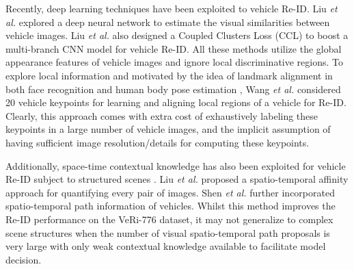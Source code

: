 \documentclass[10pt,twocolumn,letterpaper]{article}
\def\etal{\emph{et al.\hspace{0.3em}}}
\begin{document}
Recently, deep learning techniques have been exploited to vehicle Re-ID.  Liu
\etal \cite{liu2016veri} explored a deep neural network to estimate the
visual similarities between vehicle images.
%
Liu \etal \cite{liu2016vehicleid} also designed a Coupled Clusters Loss (CCL)
to boost a multi-branch CNN model for vehicle Re-ID.
%
All these methods utilize the global appearance features of vehicle images and
ignore local discriminative regions.
%
To explore local information and motivated by the idea of landmark alignment
\cite{zhang2014facial} in both face recognition \cite{taigman2014deepface} and
human body pose estimation \cite{newell2016stacked}, Wang \etal
\cite{Wang_2017_ICCV} considered 20 vehicle keypoints for learning and aligning
local regions of a vehicle for Re-ID.  Clearly, this approach comes with extra
cost of exhaustively labeling these keypoints in a large number of vehicle
images, and the implicit assumption of having sufficient image
resolution/details for computing these keypoints.
%

Additionally,
space-time contextual knowledge has also been exploited for vehicle Re-ID
subject to structured scenes \cite{liu2016veri,Shen_2017_ICCV}.
Liu \etal \cite{liu2016veri} proposed
a spatio-temporal affinity approach for quantifying every pair of images.
%
Shen \etal \cite{Shen_2017_ICCV} further
incorporated spatio-temporal path information of vehicles.
Whilst this method improves the Re-ID performance on the VeRi-776 dataset,
it may not generalize to complex scene structures when the number of
visual spatio-temporal path proposals is very large with only weak contextual
knowledge available to facilitate model decision.
\end{document}

